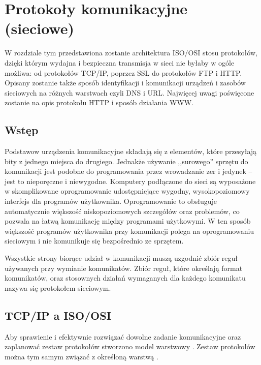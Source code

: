 \chapter{Protokoły komunikacyjne (sieciowe)}
\label{r02}

W rozdziale tym przedstawiona zostanie architektura ISO/OSI stosu protokołów, dzięki którym wydajna i bezpieczna 
transmisja w sieci nie byłaby w ogóle możliwa: od protokołów TCP/IP, poprzez SSL do protokołów FTP i HTTP. 
Opisany zostanie także sposób identyfikacji i komunikacji urządzeń i zasobów sieciowych na różnych warstwach 
czyli DNS i URL. Najwięcej uwagi poświęcone zostanie na opis protokołu HTTP i sposób działania WWW.

\section{Wstęp}

Podstawow urządzenia komunikacyjne składają się z elementów, które przesyłają bity z jednego miejsca do drugiego. Jednakże
używanie ,,surowego'' sprzętu do komunikacji jest podobne do programowania przez wrowadzanie zer i jedynek -- jest to 
nieporęczne i niewygodne. Komputery podłączone do sieci są wyposażone w skomplikowane oprogramowanie udostępniejące
wygodny, wysokopoziomowy interfejs dla programów użytkownika. Oprogramowanie to obsługuje automatycznie większość 
niskopoziomowych szczegółów oraz problemów, co pozwala na łatwą komunikację między programami użytkowymi. W ten sposób
większość programów użytkownika przy komunikacji polega na oprogramowaniu sieciowym i nie komunikuje się bezpośrednio ze
sprzętem.

Wszystkie strony biorące udział w komunikacji muszą uzgodnić zbiór reguł używanych przy wymianie komunikatów. Zbiór reguł, 
które określają format komunikatów, oraz stosownych działań wymaganych dla każdego komunikatu nazywa się protokołem sieciowym.

\section{TCP/IP a ISO/OSI}

Aby sprawienie i efektywnie rozwiązać dowolne zadanie komunikacyjne oraz zaplanować zestaw 
protokołów stworzono model warstwowy \cite{siecikomputerowe}.
Zestaw protokołów można tym samym związać z określoną warstwą \cite{barylo1}.

